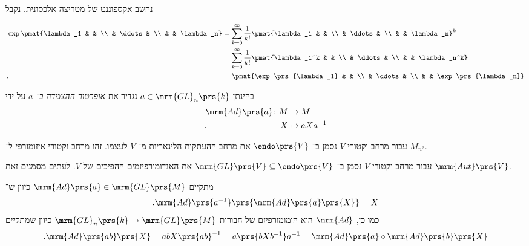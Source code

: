 \documentclass[10pt, twoside]{book}
\begin{document}
\begin{example}
נחשב אקספוננט של מטריצה אלכסונית. נקבל
\begin{otherlanguage}{english}
\begin{align*}
\exp\pmat{\lambda_1 & & \\ & \ddots & \\ & & \lambda_n}
&=
\sum_{k = 0}^{\infty} \frac{1}{k!} \pmat{\lambda_1 & & \\ & \ddots & \\ & & \lambda_n}^k
\\&=
\sum_{k=0}^{\infty} \frac{1}{k!} \pmat{\lambda_1^k & & \\ & \ddots & \\ & & \lambda_n^k}
\\\text{.}\hphantom{\exp\pmat{\lambda_1 & & \\ & \ddots & \\ & & \lambda_n}}&=
\pmat{\exp\prs{\lambda_1} & & \\ & \ddots & \\ & & \exp\prs{\lambda_n}}
\end{align*}
\end{otherlanguage}
\end{example}

\begin{definition}
בהינתן
$a \in \mrm{GL}_n\prs{k}$
נגדיר את
\emph{אופרטור ההצמדה ב־%
$a$}
על ידי
\begin{align*}
\mrm{Ad}\prs{a} \colon M &\to M \\
\text{.} \hphantom{\mrm{Ad}\prs{a} \colon} X &\mapsto aXa^{-1}
\end{align*}
\end{definition}

\begin{notation}
עבור מרחב וקטורי
$V$
נסמן ב־%
$\endo\prs{V}$
את מרחב ההעתקות הלינאריות מ־%
$V$
לעצמו.
זהו מרחב וקטורי איזומורפי ל־%
$M_{n^2}$.
\end{notation}

\begin{notation}
עבור מרחב וקטורי
$V$
נסמן ב־%
$\mrm{GL}\prs{V} \subseteq \endo\prs{V}$
את האנדומורפיזמים ההפיכים של
$V$.
לעתים מסמנים זאת
$\mrm{Aut}\prs{V}$.
\end{notation}

\begin{remark}
מתקיים
$\mrm{Ad}\prs{a} \in \mrm{GL}\prs{M}$
כיוון ש־%
\[\text{.} \mrm{Ad}\prs{a^{-1}} \prs{\mrm{Ad}\prs{a}\prs{X}} = X\]
כמו כן,
$\mrm{Ad}$
הוא הומומורפיזם של חבורות
$\mrm{GL}_n\prs{k} \to \mrm{GL}\prs{M}$
כיוון שמתקיים
\[\text{.} \mrm{Ad}\prs{ab}\prs{X} =  ab X \prs{ab}^{-1} = a \prs{b X b^{-1}} a^{-1} = \mrm{Ad}\prs{a} \circ \mrm{Ad}\prs{b} \prs{X}\]
\end{remark}
\end{document}
